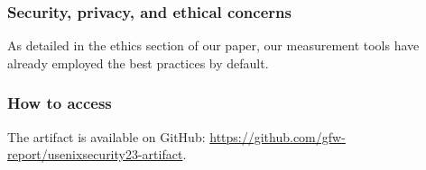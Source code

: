 
\subsubsection{Security, privacy, and ethical concerns}
As detailed in the ethics section of our paper,
our measurement tools have already employed the best practices by default.
\subsubsection{How to access}

The artifact is available on GitHub:
\url{https://github.com/gfw-report/usenixsecurity23-artifact}.


